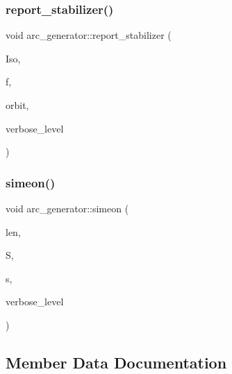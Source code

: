 \mbox{\label{classarc__generator_ac69fdbaf0cd6a5c16d9d33a29db4e5ff}} 
\subsubsection{\texorpdfstring{report\+\_\+stabilizer()}{report\_stabilizer()}}
{\footnotesize\ttfamily void arc\+\_\+generator\+::report\+\_\+stabilizer (\begin{DoxyParamCaption}\item[{\mbox{\hyperlink{classisomorph}{isomorph}} \&}]{Iso,  }\item[{ofstream \&}]{f,  }\item[{\mbox{\hyperlink{galois_8h_a09fddde158a3a20bd2dcadb609de11dc}{I\+NT}}}]{orbit,  }\item[{\mbox{\hyperlink{galois_8h_a09fddde158a3a20bd2dcadb609de11dc}{I\+NT}}}]{verbose\+\_\+level }\end{DoxyParamCaption})}

\mbox{\label{classarc__generator_a70e7c17292bbb3b63c12cc2512e45aba}} 
\subsubsection{\texorpdfstring{simeon()}{simeon()}}
{\footnotesize\ttfamily void arc\+\_\+generator\+::simeon (\begin{DoxyParamCaption}\item[{\mbox{\hyperlink{galois_8h_a09fddde158a3a20bd2dcadb609de11dc}{I\+NT}}}]{len,  }\item[{\mbox{\hyperlink{galois_8h_a09fddde158a3a20bd2dcadb609de11dc}{I\+NT}} $\ast$}]{S,  }\item[{\mbox{\hyperlink{galois_8h_a09fddde158a3a20bd2dcadb609de11dc}{I\+NT}}}]{s,  }\item[{\mbox{\hyperlink{galois_8h_a09fddde158a3a20bd2dcadb609de11dc}{I\+NT}}}]{verbose\+\_\+level }\end{DoxyParamCaption})}



\subsection{Member Data Documentation}
\mbox{\label{classarc__generator_a0985ea48e355d360a14a193742fcf21e}} 
